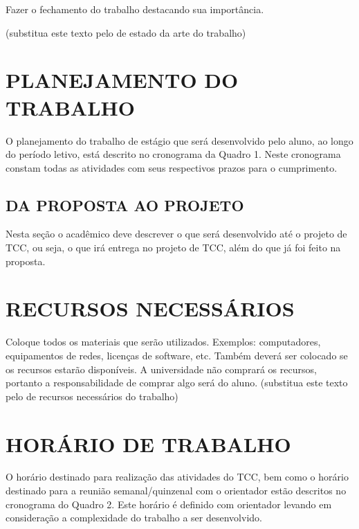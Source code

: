 Fazer o fechamento do trabalho destacando sua importância.

(substitua este texto pelo de estado da arte do trabalho)

\section{PLANEJAMENTO DO TRABALHO}
\label{sec:planejamento}
O planejamento do trabalho de estágio que será desenvolvido pelo aluno, ao longo do período letivo, está descrito no cronograma da Quadro 1. Neste cronograma constam todas as atividades com seus respectivos prazos para o cumprimento.


\subsection{DA PROPOSTA AO PROJETO}
Nesta seção o acadêmico deve descrever o que será desenvolvido até o projeto de TCC, ou seja,
o que irá entrega no projeto de TCC, além do que já foi feito na proposta.


\section{RECURSOS NECESSÁRIOS}
\label{sec:recursos}
Coloque todos os materiais que serão utilizados. Exemplos: computadores, equipamentos de redes, licenças de software, etc. Também deverá ser colocado se os recursos estarão disponíveis. A universidade não comprará os recursos, portanto a responsabilidade de comprar algo será do aluno. (substitua este texto pelo de recursos necessários do trabalho)

\section{HORÁRIO DE TRABALHO}
\label{sec:horário}
O horário destinado para realização das atividades do TCC, bem como o horário destinado para a reunião semanal/quinzenal com o orientador estão descritos no cronograma do Quadro 2. Este horário é definido com orientador levando em consideração a complexidade do trabalho a ser desenvolvido.

